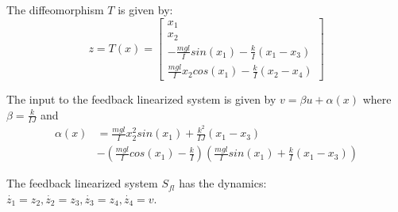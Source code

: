 The diffeomorphism $T$ is given by:
\begin{equation}
z = T(x) = \begin{bmatrix} x_1 \\ x_2 \\ -\frac{mgl}{I}sin(x_1) -\frac{k}{I}(x_1-x_3) \\ \frac{mgl}{I}x_2cos(x_1) - \frac{k}{I}(x_2-x_4)   \end{bmatrix}
\end{equation}

The input to the feedback linearized system is given by $v=\beta u+ \alpha(x)$ where $\beta=\frac{k}{IJ} $ and 
\begin{subequations}
\label{eq:fblin_inp}
\begin{align}
\alpha(x)&=\frac{mgl}{I}x_2^2sin(x_1) + \frac{k^2}{IJ}(x_1-x_3) \nonumber \\
&- (\frac{mgl}{I}cos(x_1)-\frac{k}{I})(\frac{mgl}{I}sin(x_1)+\frac{k}{I}(x_1-x_3))
\end{align}
\end{subequations}

The feedback linearized system $S_{fl}$ has the dynamics:
$\dot{z_1} = z_2, \dot{z_2} = z_3, \dot{z_3} = z_4, \dot{z_4} = v$.



